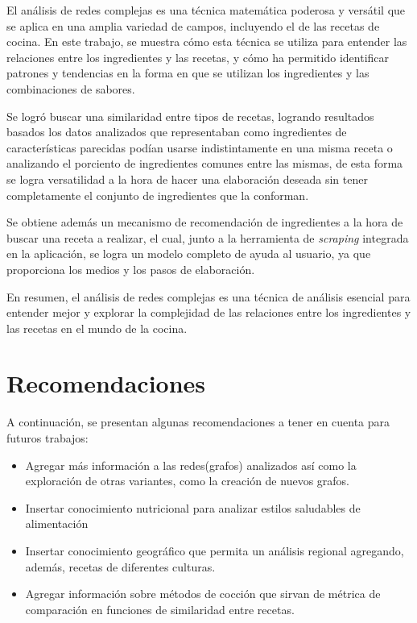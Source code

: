 \documentclass[a4paper]{article}
\begin{document}
El análisis de redes complejas es una técnica matemática poderosa y versátil que
se aplica en una amplia variedad de campos, incluyendo el de las recetas de
cocina. En este trabajo, se muestra cómo esta técnica se utiliza para entender
las relaciones entre los ingredientes y las recetas, y cómo ha permitido
identificar patrones y tendencias en la forma en que se utilizan los
ingredientes y las combinaciones de sabores.

Se logró buscar una similaridad entre tipos de recetas, logrando resultados
basados los datos analizados que representaban como ingredientes de
características parecidas podían usarse indistintamente en una misma receta o
analizando el porciento de ingredientes comunes entre las mismas, de esta forma
se logra versatilidad a la hora de hacer una elaboración deseada sin tener
completamente el conjunto de ingredientes que la conforman.

Se obtiene además un mecanismo de recomendación de ingredientes a la hora de
buscar una receta a realizar, el cual, junto a la herramienta de \emph{scraping}
integrada en la aplicación, se logra un modelo completo de ayuda al usuario, ya
que proporciona los medios y los pasos de elaboración.

En resumen, el análisis de redes complejas es una técnica de análisis esencial
para entender mejor y explorar la complejidad de las relaciones entre los
ingredientes y las recetas en el mundo de la cocina.


\section{Recomendaciones}\label{sec:rec}

A continuación, se presentan algunas recomendaciones a tener en cuenta para
futuros trabajos:
\begin{itemize}
	\item Agregar más información a las redes(grafos) analizados así como la
	exploración de otras variantes, como la creación de nuevos grafos.
	\item Insertar conocimiento nutricional para analizar estilos saludables de
	alimentación
	\item Insertar conocimiento geográfico que permita un análisis regional
	agregando, además, recetas de diferentes culturas.
	\item Agregar información sobre métodos de cocción que sirvan de métrica de
	comparación en funciones de similaridad entre recetas.
\end{itemize}
\end{document}
